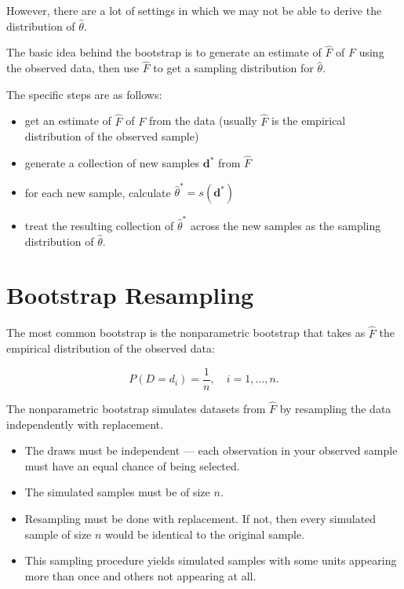 \documentclass[
  letterpaper,
  DIV=11,
  numbers=noendperiod]{scrreport}
\begin{document}
However, there are a lot of settings in which we may not be able to
derive the distribution of \(\hat \theta\).

The basic idea behind the bootstrap is to generate an estimate of
\(\hat F\) of \(F\) using the observed data, then use \(\hat F\) to get
a sampling distribution for \(\hat \theta\).

The specific steps are as follows:

\begin{itemize}
\item
  get an estimate of \(\hat F\) of \(F\) from the data (usually
  \(\hat F\) is the empirical distribution of the observed sample)
\item
  generate a collection of new samples \(\pmb d^*\) from \(\hat F\)
\item
  for each new sample, calculate \(\hat \theta^* = s(\pmb d^*)\)
\item
  treat the resulting collection of \(\hat \theta^*\) across the new
  samples as the sampling distribution of \(\hat \theta\).
\end{itemize}

\hypertarget{bootstrap-resampling}{%
\section{Bootstrap Resampling}\label{bootstrap-resampling}}

The most common bootstrap is the nonparametric bootstrap that takes as
\(\hat F\) the {empirical distribution} of the observed data:

\[
P(D=d_i) = \frac{1}{n}, \quad i = 1,...,n.
\]

The nonparametric bootstrap simulates datasets from \(\hat F\) by
resampling the data independently with replacement.

\begin{itemize}
\item
  The draws must be independent --- each observation in your observed
  sample must have an equal chance of being selected.
\item
  The simulated samples must be of size \(n\).
\item
  Resampling must be done with replacement. If not, then every simulated
  sample of size \(n\) would be identical to the original sample.
\item
  This sampling procedure yields simulated samples with some units
  appearing more than once and others not appearing at all.
\end{itemize}
\end{document}
